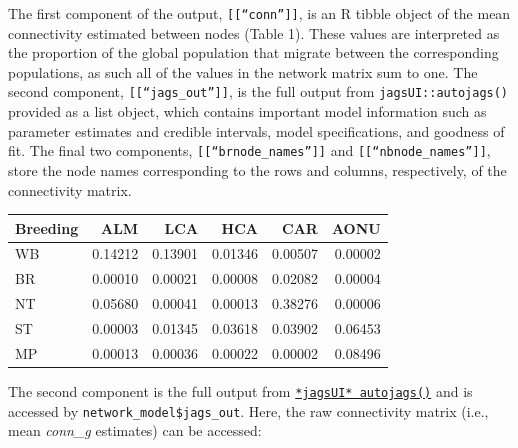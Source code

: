 \documentclass[
]{book}
\newenvironment{Shaded}{\begin{snugshade}}{\end{snugshade}}
\newcommand{\NormalTok}[1]{#1}
\newcommand{\OtherTok}[1]{\textcolor[rgb]{0.56,0.35,0.01}{#1}}
\newcommand{\SpecialCharTok}[1]{\textcolor[rgb]{0.81,0.36,0.00}{\textbf{#1}}}
\begin{document}
The first component of the output, \texttt{{[}{[}“conn”{]}{]}}, is an R tibble object of the mean connectivity estimated between nodes (Table 1). These values are interpreted as the proportion of the global population that migrate between the corresponding populations, as such all of the values in the network matrix sum to one. The second component, \texttt{{[}{[}“jags\_out”{]}{]}}, is the full output from \texttt{jagsUI::autojags()} provided as a list object, which contains important model information such as parameter estimates and credible intervals, model specifications, and goodness of fit. The final two components, \texttt{{[}{[}“brnode\_names”{]}{]}} and \texttt{{[}{[}“nbnode\_names”{]}{]}}, store the node names corresponding to the rows and columns, respectively, of the connectivity matrix.

\begin{Shaded}
\end{Shaded}

\begin{tabular}{l|r|r|r|r|r}
\hline
Breeding & ALM & LCA & HCA & CAR & AONU\\
\hline
WB & 0.14212 & 0.13901 & 0.01346 & 0.00507 & 0.00002\\
\hline
BR & 0.00010 & 0.00021 & 0.00008 & 0.02082 & 0.00004\\
\hline
NT & 0.05680 & 0.00041 & 0.00013 & 0.38276 & 0.00006\\
\hline
ST & 0.00003 & 0.01345 & 0.03618 & 0.03902 & 0.06453\\
\hline
MP & 0.00013 & 0.00036 & 0.00022 & 0.00002 & 0.08496\\
\hline
\end{tabular}

The second component is the full output from \href{https://rdrr.io/cran/jagsUI/man/autojags.html}{\texttt{*jagsUI*\ autojags()}} and is accessed by \texttt{network\_model\$jags\_out}. Here, the raw connectivity matrix (i.e., mean \emph{conn\_g} estimates) can be accessed:

\begin{Shaded}
\end{Shaded}
\end{document}
